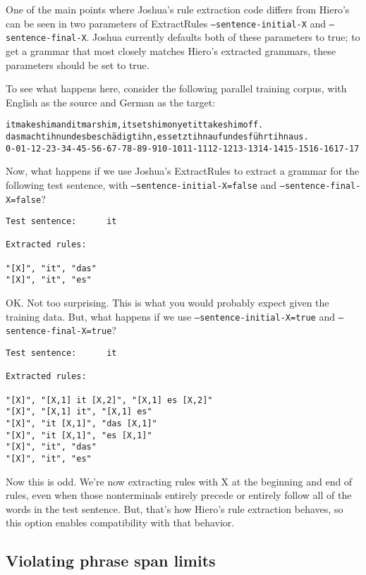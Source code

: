 One of the main points where Joshua's rule extraction code differs from Hiero's can be seen in two parameters of ExtractRules {\tt --sentence-initial-X} and {\tt --sentence-final-X}. Joshua currently defaults both of these parameters to true; to get a grammar that most closely matches Hiero's extracted grammars, these parameters should be set to true.

To see what happens here, consider the following parallel training corpus, with English as the source and German as the target:

\begin{alltt}
it makes him and it mars him , it sets him on yet it takes him off .
das macht ihn und es besch\"adigt ihn , es setzt ihn auf und es f\"uhrt ihn aus .
0-0 1-1 2-2 3-3 4-4 5-5 6-6 7-7 8-8 9-9 10-10 11-11 12-12 13-13 14-14 15-15 16-16 17-17
\end{alltt}

Now, what happens if we use Joshua's ExtractRules to extract a grammar for the following test sentence, with {\tt --sentence-initial-X=false} and {\tt --sentence-final-X=false}?

\begin{verbatim}
Test sentence:		it

Extracted rules:

"[X]", "it", "das"
"[X]", "it", "es"
\end{verbatim}

OK. Not too surprising. This is what you would probably expect given the training data. But, what happens if we use {\tt --sentence-initial-X=true} and {\tt --sentence-final-X=true}?

\begin{verbatim}
Test sentence:		it

Extracted rules:

"[X]", "[X,1] it [X,2]", "[X,1] es [X,2]"
"[X]", "[X,1] it", "[X,1] es"
"[X]", "it [X,1]", "das [X,1]"
"[X]", "it [X,1]", "es [X,1]"
"[X]", "it", "das"
"[X]", "it", "es"
\end{verbatim}

Now this is odd. We're now extracting rules with X at the beginning and end of rules, even when those nonterminals entirely precede or entirely follow all of the words in the test sentence. But, that's how Hiero's rule extraction behaves, so this option enables compatibility with that behavior.


\subsection{Violating phrase span limits}

